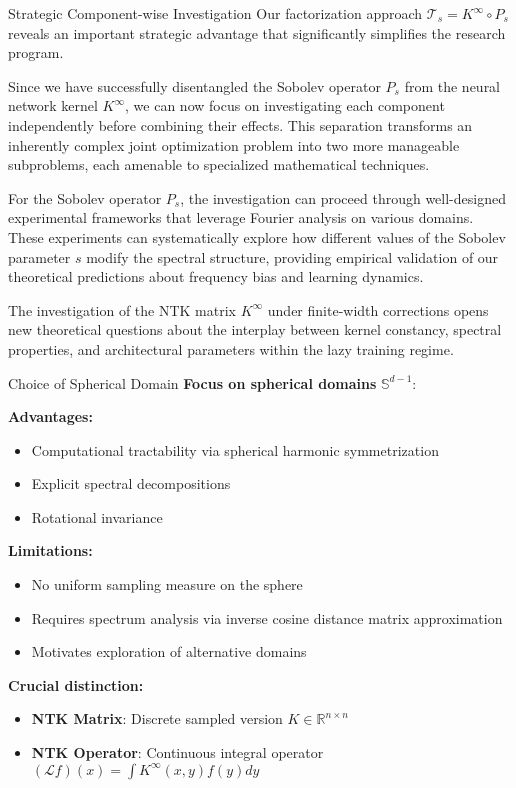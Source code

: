 \documentclass{beamer}
\begin{document}
\begin{frame}{Strategic Component-wise Investigation}
Our factorization approach $\mathcal{T}_s = K^{\infty} \circ P_s$ reveals an important strategic advantage that significantly simplifies the research program.

Since we have successfully disentangled the Sobolev operator $P_s$ from the neural network kernel $K^{\infty}$, we can now focus on investigating each component independently before combining their effects. This separation transforms an inherently complex joint optimization problem into two more manageable subproblems, each amenable to specialized mathematical techniques.

For the Sobolev operator $P_s$, the investigation can proceed through well-designed experimental frameworks that leverage Fourier analysis on various domains. These experiments can systematically explore how different values of the Sobolev parameter $s$ modify the spectral structure, providing empirical validation of our theoretical predictions about frequency bias and learning dynamics.

The investigation of the NTK matrix $K^{\infty}$ under finite-width corrections opens new theoretical questions about the interplay between kernel constancy, spectral properties, and architectural parameters within the lazy training regime.
\end{frame}

\begin{frame}{Choice of Spherical Domain}
\textbf{Focus on spherical domains} $\mathbb{S}^{d-1}$:

\textbf{Advantages:}
\begin{itemize}
\item Computational tractability via spherical harmonic symmetrization
\item Explicit spectral decompositions
\item Rotational invariance
\end{itemize}

\textbf{Limitations:}
\begin{itemize}
\item No uniform sampling measure on the sphere
\item Requires spectrum analysis via inverse cosine distance matrix approximation
\item Motivates exploration of alternative domains
\end{itemize}

\textbf{Crucial distinction:}
\begin{itemize}
\item \textbf{NTK Matrix}: Discrete sampled version $K \in \mathbb{R}^{n \times n}$
\item \textbf{NTK Operator}: Continuous integral operator $(\mathcal{L}f)(x) = \int K^{\infty}(x,y)f(y)dy$
\end{itemize}
\end{frame}
\end{document}
